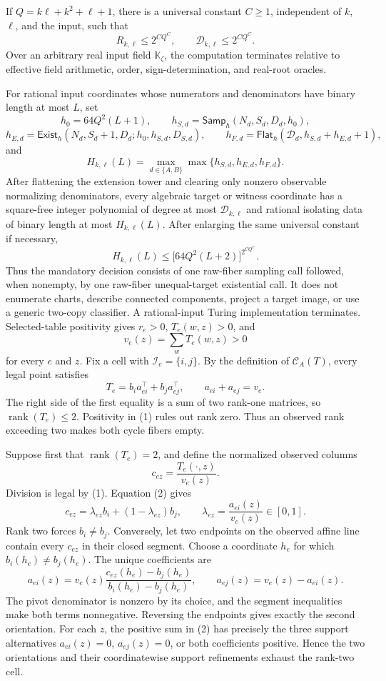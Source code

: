 If \(Q=k\ell+k^2+\ell+1\), there is a universal constant \(C\geq1\), independent of \(k\), \(\ell\), and the input, such that
\[
R_{k,\ell}\leq2^{CQ^C},
\qquad
\mathcal D_{k,\ell}\leq2^{CQ^C}.
\]
Over an arbitrary real input field \(\mathbb K_{\zeta}\), the computation terminates relative to effective field arithmetic, order, sign-determination, and real-root oracles.

For rational input coordinates whose numerators and denominators have binary length at most \(L\), set
\[
h_0=64Q^2(L+1),
\qquad
h_{S,d}=\mathsf{Samp}_h(N_d,S_d,D_d,h_0),
\]
\[
h_{E,d}=\mathsf{Exist}_h(N_d,S_d+1,D_d;h_0,h_{S,d},D_{S,d}),
\qquad
h_{F,d}=\mathsf{Flat}_h(\mathcal D_d,h_{S,d}+h_{E,d}+1),
\]
and
\[
H_{k,\ell}(L)=
\max_{d\in\{A,B\}}\max\{h_{S,d},h_{E,d},h_{F,d}\}.
\]
After flattening the extension tower and clearing only nonzero observable normalizing denominators, every algebraic target or witness coordinate has a square-free integer polynomial of degree at most \(\mathcal D_{k,\ell}\) and rational isolating data of binary length at most \(H_{k,\ell}(L)\).  After enlarging the same universal constant if necessary,
\[
H_{k,\ell}(L)
\leq
\bigl[64Q^2(L+2)\bigr]^{2^{CQ^C}}.
\]
Thus the mandatory decision consists of one raw-fiber sampling call followed, when nonempty, by one raw-fiber unequal-target existential call.  It does not enumerate charts, describe connected components, project a target image, or use a generic two-copy classifier.  A rational-input Turing implementation terminates.
Selected-table positivity gives \(r_e>0\), \(T_e(w,z)>0\), and
\[
v_e(z)=\sum_wT_e(w,z)>0                                      \tag{1}
\]
for every \(e\) and \(z\).  Fix a cell with \(\mathcal I_e=\{i,j\}\).  By the definition of \(\mathcal C_A(T)\), every legal point satisfies
\[
T_e=b_i a_{ei}^{\top}+b_j a_{ej}^{\top},
\qquad
a_{ei}+a_{ej}=v_e.                                           \tag{2}
\]
The right side of the first equality is a sum of two rank-one matrices, so \(\operatorname{rank}(T_e)\leq2\).  Positivity in (1) rules out rank zero.  Thus an observed rank exceeding two makes both cycle fibers empty.

Suppose first that \(\operatorname{rank}(T_e)=2\), and define the normalized observed columns
\[
c_{ez}=\frac{T_e(\cdot,z)}{v_e(z)}.
\]
Division is legal by (1).  Equation (2) gives
\[
c_{ez}=\lambda_{ez}b_i+(1-\lambda_{ez})b_j,
\qquad
\lambda_{ez}=\frac{a_{ei}(z)}{v_e(z)}\in[0,1].               \tag{3}
\]
Rank two forces \(b_i\neq b_j\).  Conversely, let two endpoints on the observed affine line contain every \(c_{ez}\) in their closed segment.  Choose a coordinate \(h_e\) for which \(b_i(h_e)\neq b_j(h_e)\).  The unique coefficients are
\[
a_{ei}(z)=v_e(z)
 \frac{c_{ez}(h_e)-b_j(h_e)}{b_i(h_e)-b_j(h_e)},
\qquad
a_{ej}(z)=v_e(z)-a_{ei}(z).                                  \tag{4}
\]
The pivot denominator is nonzero by its choice, and the segment inequalities make both terms nonnegative.  Reversing the endpoints gives exactly the second orientation.  For each \(z\), the positive sum in (2) has precisely the three support alternatives \(a_{ei}(z)=0\), \(a_{ej}(z)=0\), or both coefficients positive.  Hence the two orientations and their coordinatewise support refinements exhaust the rank-two cell.


